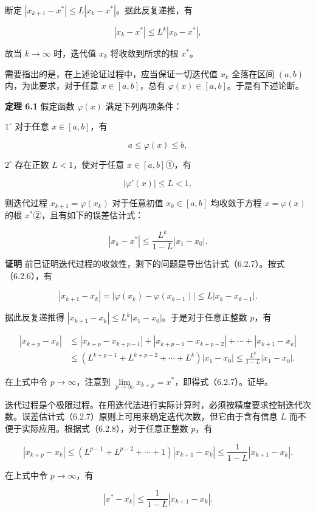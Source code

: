 \documentclass[
  10pt,
  fontset=fandol]{ctexart}
\begin{document}
断定 \(|x_{k+1}-x^*|\leqslant L|x_k-x^*|\)。据此反复递推，有

\[
|x_k-x^*|\leqslant L^k|x_0-x^*|,
\]

故当 \(k\to\infty\) 时，迭代值 \(x_k\) 将收敛到所求的根 \(x^*\)。

需要指出的是，在上述论证过程中，应当保证一切迭代值 \(x_k\) 全落在区间 \((a,b)\) 内，为此要求，对于任意 \(x\in[a,b]\)，总有 \(\varphi(x)\in[a,b]\)。于是有下述论断。

\textbf{定理 6.1} 假定函数 \(\varphi(x)\) 满足下列两项条件：

\(1^\circ\) 对于任意 \(x\in[a,b]\)，有

\[
a\leqslant\varphi(x)\leqslant b,
\tag{6.2.5}
\]

\(2^\circ\) 存在正数 \(L<1\)，使对于任意 \(x\in[a,b]\)①，有

\[
|\varphi'(x)|\leqslant L<1,
\tag{6.2.6}
\]

则迭代过程 \(x_{k+1}=\varphi(x_k)\) 对于任意初值 \(x_0\in[a,b]\) 均收敛于方程 \(x=\varphi(x)\) 的根 \(x^*\)②，且有如下的误差估计式：

\[
|x_k-x^*|\leqslant\frac{L^k}{1-L}|x_1-x_0|.
\tag{6.2.7}
\]

\textbf{证明} 前已证明迭代过程的收敛性，剩下的问题是导出估计式（6.2.7）。按式（6.2.6），有

\[
|x_{k+1}-x_k|=|\varphi(x_k)-\varphi(x_{k-1})|\leqslant L|x_k-x_{k-1}|.
\tag{6.2.8}
\]

据此反复递推得 \(|x_{k+1}-x_k|\leqslant L^k|x_1-x_0|\)。于是对于任意正整数 \(p\)，有

\[
\begin{aligned}
|x_{k+p}-x_k|&\leqslant|x_{k+p}-x_{k+p-1}|+|x_{k+p-1}-x_{k+p-2}|+\cdots+|x_{k+1}-x_k|\\
&\leqslant(L^{k+p-1}+L^{k+p-2}+\cdots+L^k)|x_1-x_0|\leqslant\frac{L^k}{1-L}|x_1-x_0|.
\end{aligned}
\]

在上式中令 \(p\to\infty\)，注意到 \(\lim\limits_{p\to\infty}x_{k+p}=x^*\)，即得式（6.2.7）。证毕。

迭代过程是个极限过程。在用迭代法进行实际计算时，必须按精度要求控制迭代次数。误差估计式（6.2.7）原则上可用来确定迭代次数，但它由于含有信息 \(L\) 而不便于实际应用。根据式（6.2.8），对于任意正整数 \(p\)，有

\[
|x_{k+p}-x_k|\leqslant(L^{p-1}+L^{p-2}+\cdots+1)|x_{k+1}-x_k|\leqslant\frac{1}{1-L}|x_{k+1}-x_k|.
\]

在上式中令 \(p\to\infty\)，有

\[
|x^*-x_k|\leqslant\frac{1}{1-L}|x_{k+1}-x_k|.
\]
\end{document}
